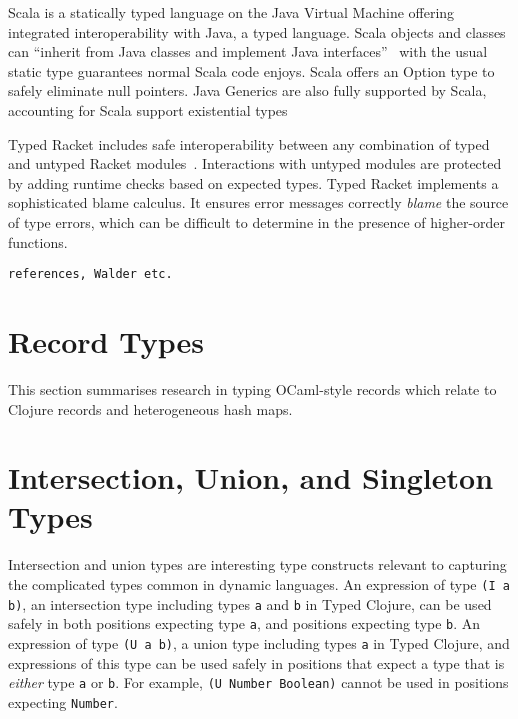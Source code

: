 Scala is a statically typed language on the Java Virtual Machine offering integrated interoperability with Java, a typed language.
Scala objects and classes can ``inherit from Java classes and implement Java interfaces''~\cite{OCD+}
with the usual static type guarantees normal Scala code enjoys.
Scala offers an Option type to safely eliminate null pointers.
Java Generics are also fully supported by Scala, accounting for Scala support existential types

Typed Racket includes safe interoperability between any combination of typed and untyped 
Racket modules~\cite{Tob10,TF08}. 
Interactions with untyped modules are protected by adding runtime checks based on expected types.
Typed Racket implements a sophisticated blame calculus. It ensures 
error messages correctly \emph{blame} the source of type errors,
which can be difficult to determine in the presence of higher-order functions. 
\begin{verbatim}references, Walder etc.\end{verbatim}

\section{Record Types}

This section summarises research in typing OCaml-style records
which relate to Clojure records and heterogeneous hash maps.

\section{Intersection, Union, and Singleton Types}
\label{sec:intersectionunion}



Intersection and union types are interesting type constructs relevant to capturing the complicated
types common in dynamic languages.
An expression of type \lstinline|(I a b)|, an intersection type including types \lstinline|a|
and \lstinline|b| in Typed Clojure, can be used safely in both positions expecting type \lstinline|a|,
and positions expecting type \lstinline|b|.
An expression of type \lstinline|(U a b)|, a union type including types \lstinline|a| in Typed Clojure,
and expressions of this type can be used safely in positions 
that expect a type that is \emph{either} type \lstinline|a|
or \lstinline|b|.
For example, \lstinline|(U Number Boolean)| cannot be used in positions expecting \lstinline|Number|.


